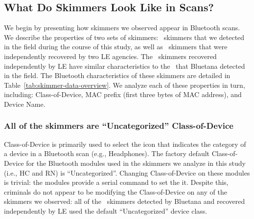 \subsection{What Do Skimmers Look Like in Scans?} %
\label{sec:bluetooth:skimmers}

\begin{table}
    \centering\small
    
    \caption{Bluetooth scan properties of skimmers observed during our study.
    The exact Device Names are not shown, instead we describe the names we found.
    }
    \label{tab:skimmer-data-overview}
\end{table}


We begin by presenting how skimmers we observed appear in Bluetooth scans.
%
We describe the properties of two sets of skimmers: \totalskimmers~skimmers that we detected in the field
during the course of this study, as well as \totalskimmersLE~skimmers that were independently recovered by two LE agencies.
%
The \totalskimmersLE~skimmers recovered independently by LE have similar characteristics to the \totalskimmers~that Bluetana detected in the field.
%
%
The Bluetooth characteristics of these skimmers are
detailed in Table~\ref{tab:skimmer-data-overview}.
%
We analyze each of these properties in turn, including: Class-of-Device, MAC prefix (first three bytes of MAC address), and Device Name. 

\subsubsection*{All of the skimmers are ``Uncategorized'' Class-of-Device}

Class-of-Device 
%
is primarily 
used to select the icon that indicates the category of a device in a Bluetooth
scan (e.g., Headphones).
%
The factory default Class-of-Device for the Bluetooth modules used in the
skimmers we analyze in this study (i.e., HC and RN) is ``Uncategorized''.
%
Changing Class-of-Device on these modules is trivial: the modules provide a serial
command to set the it.
%
Despite this, criminals do not appear to be modifying the Class-of-Device on
any of the skimmers we observed:
%
all of the \totalskimmersseen~skimmers detected by Bluetana and recovered independently by LE
used the default ``Uncategorized'' device class.
%

